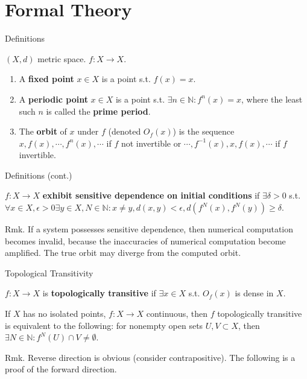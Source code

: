\documentclass[aspectratio=169]{beamer}
\begin{document}
\section{Formal Theory}
\frame{\sectionpage}

\begin{frame}{Definitions}
    \begin{defn}
        $(X,d)$ metric space. $f:X\rightarrow X$. 
        \begin{enumerate}
            \item A \textbf{fixed point} $x\in X$ is a point s.t. $f(x)=x$. 
            \item A \textbf{periodic point} $x \in X$ is a point s.t. $\exists n\in\mathbb{N} : f^n(x)=x$, where the least such $n$ is called the \textbf{prime period}. 
            \item The \textbf{orbit} of $x$ under $f$ (denoted $O_f(x)$) is the sequence $x, f(x),\cdots,f^n(x),\cdots$ if $f$ not invertible or $\cdots, f^{-1}(x), x, f(x),\cdots$ if $f$ invertible. 
        \end{enumerate}
    \end{defn}  
\end{frame}

\begin{frame}{Definitions (cont.)}
    \begin{defn}
        $f:X\rightarrow X$ \textbf{exhibit sensitive dependence on initial conditions} if $\exists \delta > 0$ s.t. $\forall x \in X, \epsilon>0 \exists y\in X, N\in \mathbb{N} : x\neq y, d(x,y)<\epsilon, d(f^N(x),f^N(y)) \geq \delta$.
    \end{defn}
    Rmk. If a system possesses sensitive dependence, then numerical computation becomes invalid, because the inaccuracies of numerical computation become amplified. The true orbit may diverge from the computed orbit.
\end{frame}

\begin{frame}{Topological Transitivity}
    \begin{defn}
        $f:X\rightarrow X$ is \textbf{topologically transitive} if $\exists x\in X$ s.t. $O_f(x)$ is dense in $X$. 
    \end{defn}
    \begin{prop}
        If $X$ has no isolated points, $f:X\rightarrow X$ continuous, then $f$ topologically transitive is equivalent to the following: for nonempty open sets $U, V \subset X$, then $\exists N\in\mathbb{N} : f^N(U) \cap V \neq \emptyset$.
    \end{prop}
    Rmk. Reverse direction is obvious (consider contrapositive). The following is a proof of the forward direction. 
\end{frame}
\end{document}
